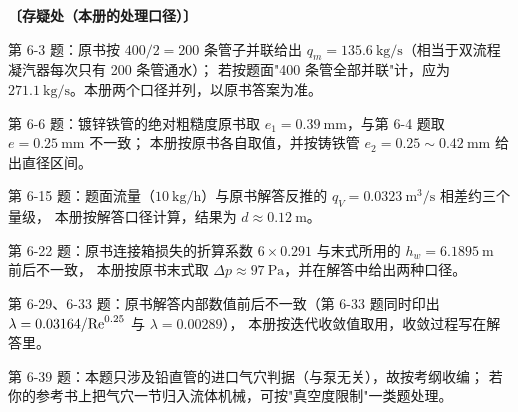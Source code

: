 \begin{tishi}
\textbf{〔存疑处（本册的处理口径）〕}
\begin{xiaowen}
\item 第 6-3 题：原书按 $400/2=200$ 条管子并联给出 $q_m=135.6\ \mathrm{kg/s}$（相当于双流程凝汽器每次只有 200 条管通水）；
若按题面"400 条管全部并联"计，应为 $271.1\ \mathrm{kg/s}$。本册两个口径并列，以原书答案为准。
\item 第 6-6 题：镀锌铁管的绝对粗糙度原书取 $e_1=0.39\ \mathrm{mm}$，与第 6-4 题取 $e=0.25\ \mathrm{mm}$ 不一致；
本册按原书各自取值，并按铸铁管 $e_2=0.25\sim0.42\ \mathrm{mm}$ 给出直径区间。
\item 第 6-15 题：题面流量（$10\ \mathrm{kg/h}$）与原书解答反推的 $q_V=0.0323\ \mathrm{m^3/s}$ 相差约三个量级，
本册按解答口径计算，结果为 $d\approx0.12\ \mathrm{m}$。
\item 第 6-22 题：原书连接箱损失的折算系数 $6\times0.291$ 与末式所用的 $h_w=6.1895\ \mathrm{m}$ 前后不一致，
本册按原书末式取 $\Delta p\approx97\ \mathrm{Pa}$，并在解答中给出两种口径。
\item 第 6-29、6-33 题：原书解答内部数值前后不一致（第 6-33 题同时印出 $\lambda=0.03164/\mathrm{Re}^{0.25}$ 与 $\lambda=0.00289$），
本册按迭代收敛值取用，收敛过程写在解答里。
\item 第 6-39 题：本题只涉及铅直管的进口气穴判据（与泵无关），故按考纲收编；
若你的参考书上把气穴一节归入流体机械，可按"真空度限制"一类题处理。
\end{xiaowen}
\end{tishi}
